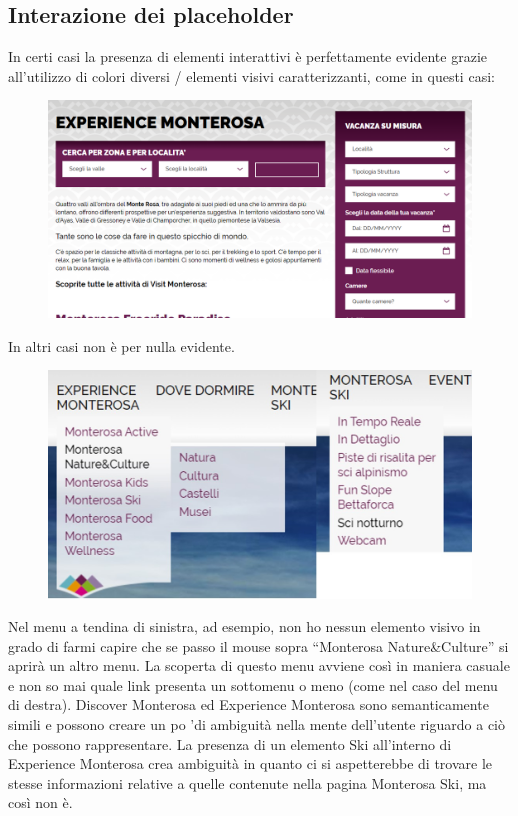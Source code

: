         \subsection{Interazione dei placeholder}
        In certi casi la presenza di elementi interattivi è perfettamente
        evidente grazie all’utilizzo di colori diversi / elementi visivi
        caratterizzanti, come in questi casi:
        \begin{figure}[H]
            \centering
            \includegraphics[scale=0.2]{resources/images/interactionPlaceholder1.png}
        \end{figure}
        In altri casi non è per nulla evidente.
        \begin{figure}[H]
            \centering 
            \includegraphics[scale=0.3]{resources/images/interactionPlaceholderFinal.jpg}
        \end{figure}
        Nel menu a tendina di sinistra, ad esempio, non ho nessun elemento
        visivo in grado di farmi capire che se passo il mouse sopra “Monterosa
        Nature\&Culture” si aprirà un altro menu. La scoperta di questo menu
        avviene così in maniera casuale e non so mai quale link presenta un
        sottomenu o meno (come nel caso del menu di destra). Discover Monterosa
        ed Experience Monterosa sono semanticamente simili e possono creare un
        po 'di ambiguità nella mente dell'utente riguardo a ciò che possono
        rappresentare. La presenza di un elemento Ski all'interno di Experience
        Monterosa crea ambiguità in quanto ci si aspetterebbe di trovare le
        stesse informazioni relative a quelle contenute nella pagina Monterosa
        Ski, ma così non è.
        
